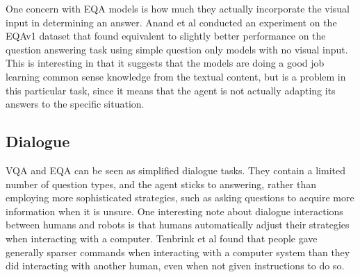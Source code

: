 One concern with EQA models is how much they actually incorporate the visual input in determining an answer. Anand et al conducted an experiment on the EQAv1 dataset that found equivalent to slightly better performance on the question answering task using simple question only models with no visual input\cite{blindfolded}. This is interesting in that it suggests that the models are doing a good job learning common sense knowledge from the textual content, but is a problem in this particular task, since it means that the agent is not actually adapting its answers to the specific situation. 

\subsection{Dialogue}
VQA and EQA can be seen as simplified dialogue tasks. They contain a limited number of question types, and the agent sticks to answering, rather than employing more sophisticated strategies, such as asking questions to acquire more information when it is unsure. One interesting note about dialogue interactions between humans and robots is that humans automatically adjust their strategies when interacting with a computer. %
Tenbrink et al found that people gave generally sparser commands when interacting with a computer system than they did interacting with another human, even when not given instructions to do so\cite{Tenbrink:2010qf}. \newline
